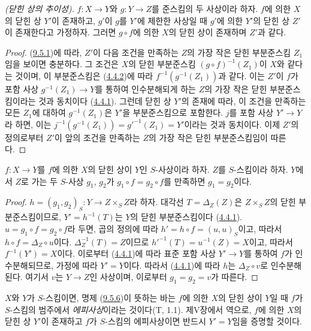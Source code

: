 \begin{proposition}[9.5.5]
\label{I.9.5.5-ko}
\emph{(닫힌 상의 추이성).} $f:X\to Y$와 $g:Y\to Z$를 준스킴의
두 사상이라 하자. $f$에 의한 $X$의 닫힌 상 $Y'$이 존재하고,
$g'$이 $g$를 $Y'$에 제한한 사상일 때 $g'$에 의한 $Y'$의 닫힌 상
$Z'$이 존재한다고 가정하자. 그러면 $g\circ f$에 의한 $X$의 닫힌
상이 존재하며 $Z'$과 같다.
\end{proposition}

\begin{proof}
(\hyperref[I.9.5.1-ko]{9.5.1})에 따라, $Z'$이 다음 조건을 만족하는
$Z$의 가장 작은 닫힌 부분준스킴 $Z_1$임을 보이면 충분하다. 그
조건은 $X$의 닫힌 부분준스킴 $(g\circ f)^{-1}(Z_1)$이 $X$와 같다는
것이며, 이 부분준스킴은 (\hyperref[I.4.4.2-ko]{4.4.2})에 따라
$f^{-1}(g^{-1}(Z_1))$과 같다. 이는 $Z'$이 $f$가 포함 사상
$g^{-1}(Z_1)\to Y$를 통하여 인수분해되게 하는 $Z$의 가장 작은
닫힌 부분준스킴이라는 것과 동치이다
(\hyperref[I.4.4.1-ko]{4.4.1}). 그런데 닫힌 상 $Y'$의 존재에 따라,
이 조건을 만족하는 모든 $Z_1$에 대하여 $g^{-1}(Z_1)$은 $Y'$을
부분준스킴으로 포함한다. $j$를 포함 사상 $Y'\to Y$라 하면, 이는
$j^{-1}(g^{-1}(Z_1))=g'^{-1}(Z_1)=Y'$이라는 것과 동치이다. 이제
$Z'$의 정의로부터 $Z'$이 앞의 조건을 만족하는 $Z$의 가장 작은
닫힌 부분준스킴임이 따른다.
\end{proof}

\begin{corollary}[9.5.6]
\label{I.9.5.6-ko}
$f:X\to Y$를 $f$에 의한 $X$의 닫힌 상이 $Y$인 $S$-사상이라
하자. $Z$를 $S$-스킴이라 하자. $Y$에서 $Z$로 가는 두 $S$-사상
$g_1$, $g_2$가 $g_1\circ f=g_2\circ f$를 만족하면
$g_1=g_2$이다.
\end{corollary}

\begin{proof}
$h=(g_1,g_2)_S:Y\to Z\times_S Z$라 하자. 대각선
$T=\Delta_Z(Z)$은 $Z\times_S Z$의 닫힌 부분준스킴이므로,
$Y'=h^{-1}(T)$는 $Y$의 닫힌 부분준스킴이다
(\hyperref[I.4.4.1-ko]{4.4.1}). $u=g_1\circ f=g_2\circ f$라 두면,
곱의 정의에 따라 $h'=h\circ f=(u,u)_S$이고, 따라서
$h\circ f=\Delta_Z\circ u$이다. $\Delta_Z^{-1}(T)=Z$이므로
$h'^{-1}(T)=u^{-1}(Z)=X$이고, 따라서 $f^{-1}(Y')=X$이다. 이로부터
(\hyperref[I.4.4.1-ko]{4.4.1})에 따라 표준 포함 사상 $Y'\to Y$를 통하여
$f$가 인수분해되므로, 가정에 따라 $Y'=Y$이다. 따라서
(\hyperref[I.4.4.1-ko]{4.4.1})에 따라 $h$는 $\Delta_Z\circ v$로
인수분해된다. 여기서 $v$는 $Y\to Z$인 사상이며, 이로부터
$g_1=g_2=v$가 따른다.
\end{proof}

\begin{remark}[9.5.7]
\label{I.9.5.7-ko}
$X$와 $Y$가 $S$-스킴이면, 명제
(\hyperref[I.9.5.6-ko]{9.5.6})이 뜻하는 바는
$f$에 의한 $X$의 닫힌 상이 $Y$일 때 $f$가 $S$-스킴의 범주에서
\emph{에피사상}이라는 것이다(T, 1.1). 제V장에서 역으로, $f$에
의한 $X$의 닫힌 상 $Y'$이 존재하고 $f$가 $S$-스킴의 에피사상이면
반드시 $Y'=Y$임을 증명할 것이다.
\end{remark}


